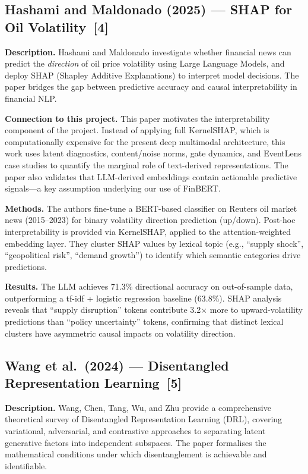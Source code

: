 \documentclass[12pt, a4paper]{article}
\begin{document}
\subsection{Hashami and Maldonado (2025) --- SHAP for Oil Volatility~[4]}

\textbf{Description.}
Hashami and Maldonado investigate whether financial news can predict the \textit{direction} of oil price volatility using Large Language Models, and deploy SHAP (Shapley Additive Explanations) to interpret model decisions. The paper bridges the gap between predictive accuracy and causal interpretability in financial NLP.

\textbf{Connection to this project.}
This paper motivates the interpretability component of the project. Instead of applying full KernelSHAP, which is computationally expensive for the present deep multimodal architecture, this work uses latent diagnostics, content/noise norms, gate dynamics, and EventLens case studies to quantify the marginal role of text-derived representations. The paper also validates that LLM-derived embeddings contain actionable predictive signals---a key assumption underlying our use of FinBERT.

\textbf{Methods.}
The authors fine-tune a BERT-based classifier on Reuters oil market news (2015--2023) for binary volatility direction prediction (up/down). Post-hoc interpretability is provided via KernelSHAP, applied to the attention-weighted embedding layer. They cluster SHAP values by lexical topic (e.g., ``supply shock'', ``geopolitical risk'', ``demand growth'') to identify which semantic categories drive predictions.

\textbf{Results.}
The LLM achieves 71.3\% directional accuracy on out-of-sample data, outperforming a tf-idf + logistic regression baseline (63.8\%). SHAP analysis reveals that ``supply disruption'' tokens contribute 3.2$\times$ more to upward-volatility predictions than ``policy uncertainty'' tokens, confirming that distinct lexical clusters have asymmetric causal impacts on volatility direction.


\subsection{Wang et al.\ (2024) --- Disentangled Representation Learning~[5]}

\textbf{Description.}
Wang, Chen, Tang, Wu, and Zhu provide a comprehensive theoretical survey of Disentangled Representation Learning (DRL), covering variational, adversarial, and contrastive approaches to separating latent generative factors into independent subspaces. The paper formalises the mathematical conditions under which disentanglement is achievable and identifiable.
\end{document}
